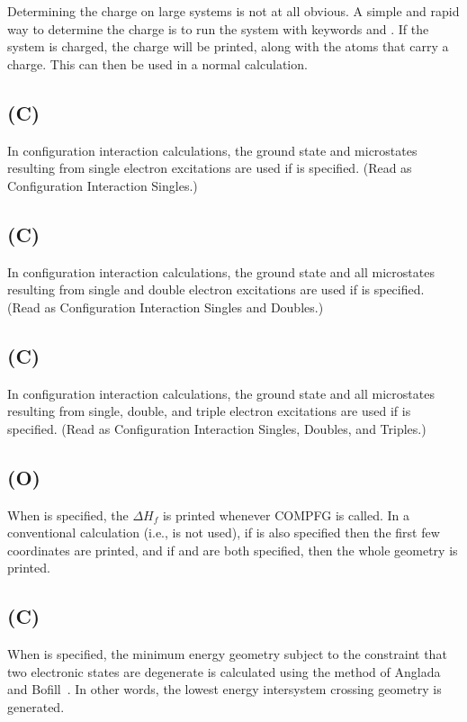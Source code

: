 Determining the charge on large systems is not at all obvious.  A simple and
rapid way to determine the charge is to run the system with keywords
 and .  If the system is charged, the charge will be
printed, along with the atoms that carry a charge.  This can then be used in a
normal calculation.

\subsection*{ (C)}
In configuration interaction calculations, the ground state and microstates resulting from
single electron excitations are used    if  is specified.  (Read
 as Configuration Interaction Singles.)

\subsection*{ (C)}
In configuration interaction calculations, the ground state and  all
microstates resulting from single and double  electron excitations are used
if  is specified.  (Read  as Configuration Interaction
Singles and Doubles.)

\subsection*{ (C)}
In configuration interaction calculations, the ground state and all microstates
resulting from single, double, and triple electron excitations are used if
 is specified.  (Read  as Configuration Interaction
Singles, Doubles, and Triples.)

\subsection*{ (O)}
When  is specified, the $\Delta H_f$ is printed whenever COMPFG is
called.  In a conventional calculation (i.e.,  is not used), if
 is also specified then the first few coordinates are printed, and
if  and  are both specified, then the whole geometry is
printed.

\subsection*{ (C)}
When  is specified, the minimum energy geometry subject to the
constraint that two electronic states are degenerate is calculated using the
method of Anglada and Bofill~\cite{cross}.  In other words, the lowest energy
intersystem crossing geometry is generated.

